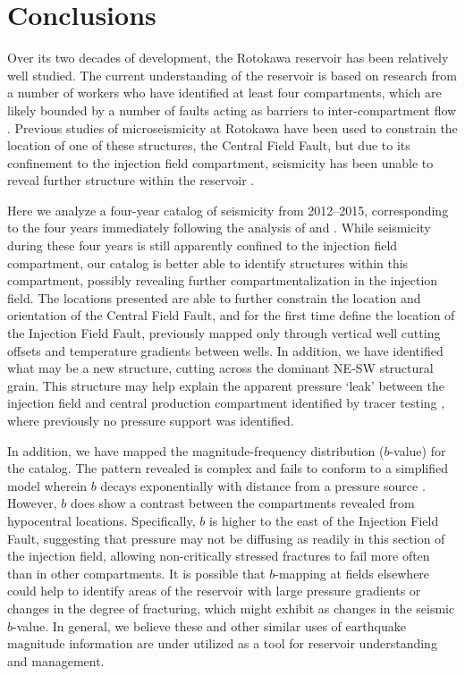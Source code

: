 \section{Conclusions}
Over its two decades of development, the Rotokawa reservoir has been relatively well studied. The current understanding of the reservoir is based on research from a number of workers who have identified at least four compartments, which are likely bounded by a number of faults acting as barriers to inter-compartment flow \citep{Sewell_2015,Addison_2017stanford,wallis2013}. Previous studies of microseismicity at Rotokawa have been used to constrain the location of one of these structures, the Central Field Fault, but due to its confinement to the injection field compartment, seismicity has been unable to reveal further structure within the reservoir \citep{Sherburn_2015,Sewell_2015WGC}.

Here we analyze a four-year catalog of seismicity from 2012--2015, corresponding to the four years immediately following the analysis of \citep{Sherburn_2015} and \citep{Sewell_2015WGC}. While seismicity during these four years is still apparently confined to the injection field compartment, our catalog is better able to identify structures within this compartment, possibly revealing further compartmentalization in the injection field. The locations presented are able to further constrain the location and orientation of the Central Field Fault, and for the first time define the location of the Injection Field Fault, previously mapped only through vertical well cutting offsets and temperature gradients between wells. In addition, we have identified what may be a new structure, cutting across the dominant NE-SW structural grain. This structure may help explain the apparent pressure `leak' between the injection field and central production compartment identified by tracer testing \citep{Addison_2017stanford}, where previously no pressure support was identified.

In addition, we have mapped the magnitude-frequency distribution ($b$-value) for the catalog. The pattern revealed is complex and fails to conform to a simplified model wherein $b$ decays exponentially with distance from a pressure source \citep{Bachmann_2012}. However, $b$ does show a contrast between the compartments revealed from hypocentral locations. Specifically, $b$ is higher to the east of the Injection Field Fault, suggesting that pressure may not be diffusing as readily in this section of the injection field, allowing non-critically stressed fractures to fail more often than in other compartments. It is possible that $b$-mapping at fields elsewhere could help to identify areas of the reservoir with large pressure gradients or changes in the degree of fracturing, which might exhibit as changes in the seismic $b$-value. In general, we believe these and other similar uses of earthquake magnitude information are under utilized as a tool for reservoir understanding and management.

